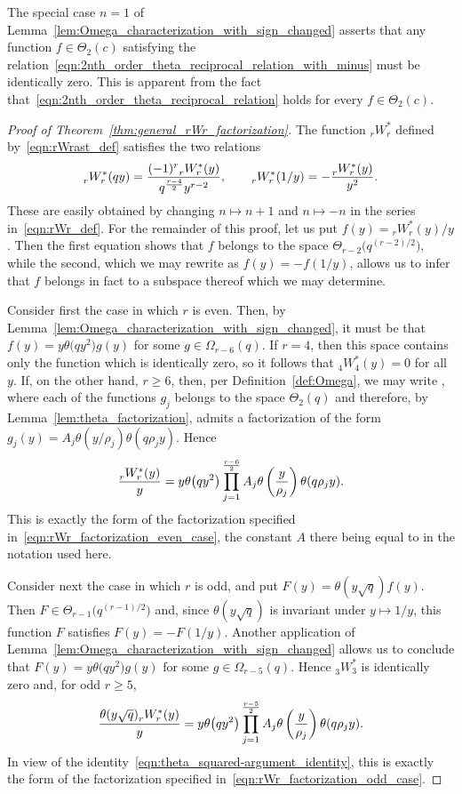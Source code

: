 \documentclass[10pt,a4paper]{amsart}
\numberwithin{equation}{section}
\begin{document}
\begin{Remark}
The special case $n=1$ of Lemma~\ref{lem:Omega_characterization_with_sign_changed} asserts that any function $f \in \Theta_2(c)$ satisfying the relation~\eqref{eqn:2nth_order_theta_reciprocal_relation_with_minus} must be identically zero. This is apparent from the fact that~\eqref{eqn:2nth_order_theta_reciprocal_relation} holds for every $f \in \Theta_2(c)$.
\end{Remark}

\begin{proof}[Proof of Theorem~\ref{thm:general_rWr_factorization}]
The function $_r^{} W_r^\ast$ defined by~\eqref{eqn:rWrast_def} satisfies the two relations
\[%
_r^{}W_r^\ast(qy) = {(-1)^r {}_r^{}W_r^\ast(y) \over q^{r-4 \over 2} y^{r-2}}, \qquad{} _r^{}W_r^\ast(1/y) = -{ {}_r^{}W_r^\ast(y) \over y^2}.
\]
These are easily obtained by changing $n \mapsto n+1$ and $n \mapsto -n$ in the series in~\eqref{eqn:rWr_def}. For the remainder of this proof, let us put $f(y) = {}_r^{}W_r^\ast(y)/y$. Then the first equation shows that $f$ belongs to the space $\Theta_{r-2}\bigl(q^{(r-2)/2}\bigr)$, while the second, which we may rewrite as $f(y)=-f(1/y)$, allows us to infer that $f$ belongs in fact to a subspace thereof which we may determine.

Consider first the case in which $r$ is even. Then, by Lemma~\ref{lem:Omega_characterization_with_sign_changed}, it must be that $f(y)=y\theta\bigl(qy^2\bigr)g(y)$ for some $g \in \Omega_{r-6}(q)$. If $r=4$, then this space contains only the function which is identically zero, so it follows that $_4^{}W_4^\ast(y)=0$ for all $y$. If, on the other hand, $r \geq 6$, then, per Definition~\ref{def:Omega}, we may write , where each of the functions $g_j$ belongs to the space $\Theta_2(q)$ and therefore, by Lemma~\ref{lem:theta_factorization}, admits a factorization of the form~${g_j(y) = A_j \theta(y/\rho_j)\theta(q\rho_j y)}$. Hence
\[ {_r^{}W_r^\ast(y) \over y} = y\theta\bigl(qy^2\bigr) \prod_{j=1}^{r-6 \over 2} A_j \theta\left({y \over \rho_j}\right)\theta(q\rho_j y). \]
This is exactly the form of the factorization specified in~\eqref{eqn:rWr_factorization_even_case}, the constant $A$ there being equal to  in the notation used here.

Consider next the case in which $r$ is odd, and put $F(y)\! =\! \theta(y\sqrt{q}) f(y)$. Then $F \!\in \!\Theta_{r-1}\bigl(q^{(r-1)/2}\bigr)$ and, since $\theta(y\sqrt{q})$ is invariant under $y \mapsto 1/y$, this function $F$ satisfies $F(y)=-F(1/y)$. Another application of Lemma~\ref{lem:Omega_characterization_with_sign_changed} allows us to conclude that $F(y) = y\theta\bigl(qy^2\bigr)g(y)$ for some $g \in \Omega_{r-5}(q)$. Hence $_3^{}W_3^\ast$ is identically zero and, for odd $r \geq 5$,
\[ {\theta(y\sqrt{q}) {}_r^{}W_r^\ast(y) \over y} = y\theta\bigl(qy^2\bigr) \prod_{j=1}^{r-5 \over 2} A_j \theta\left({y \over \rho_j}\right)\theta(q\rho_j y). \]
In view of the identity~\eqref{eqn:theta_squared-argument_identity}, this is exactly the form of the factorization specified in~\eqref{eqn:rWr_factorization_odd_case}.
\end{proof}
\end{document}
